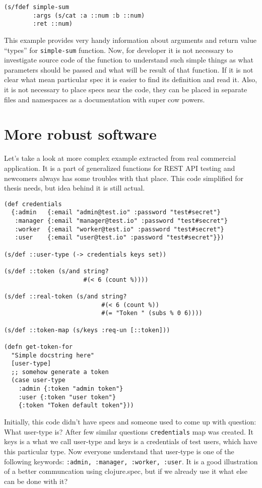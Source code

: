\begin{verbatim}
(s/fdef simple-sum
        :args (s/cat :a ::num :b ::num)
        :ret ::num)
\end{verbatim}
This example provides very handy information about arguments and return value
``types'' for \texttt{simple-sum} function. Now, for developer it is not
necessary to investigate source code of the function to understand such simple
things as what parameters should be passed and what will be result of that
function. If it is not clear what mean particular spec it is easier to find its
definition and read it. Also, it is not necessary to place specs near the code,
they can be placed in separate files and namespaces as a documentation with
super cow powers.


\section{More robust software}

Let's take a look at more complex example extracted from real
commercial application. It is a part of generalized functions for REST API
testing and newcomers always has some troubles with that place. This code
simplified for thesis needs, but idea behind it is still actual.

\begin{verbatim}
(def credentials
  {:admin   {:email "admin@test.io" :password "test#secret"}
   :manager {:email "manager@test.io" :password "test#secret"}
   :worker  {:email "worker@test.io" :password "test#secret"}
   :user    {:email "user@test.io" :password "test#secret"}})

(s/def ::user-type (-> credentials keys set))

(s/def ::token (s/and string?
                      #(< 6 (count %))))

(s/def ::real-token (s/and string?
                           #(< 6 (count %))
                           #(= "Token " (subs % 0 6))))

(s/def ::token-map (s/keys :req-un [::token]))

(defn get-token-for
  "Simple docstring here"
  [user-type]
  ;; somehow generate a token
  (case user-type
    :admin {:token "admin token"}
    :user {:token "user token"}
    {:token "Token default token"}))
\end{verbatim}


Initially, this code didn't have specs and someone used to come up with
question: What user-type is? After few similar questions
\texttt{credentials} map was created. It keys is a what we call user-type and
keys is a credentials of test users, which have this particular type. Now
everyone understand that user-type is one of the following keywords:
\texttt{:admin, :manager, :worker, :user}. It is a good illustration of a better
communcation using clojure.spec, but if we already use it what else can be done
with it?

